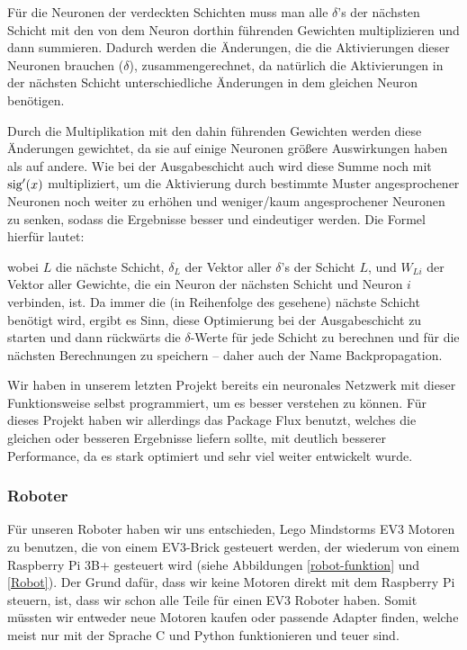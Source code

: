 \documentclass[11pt]{scrartcl}
\begin{document}
	Für die Neuronen der verdeckten Schichten muss man alle $\delta$'s der nächsten Schicht mit den von dem Neuron dorthin führenden Gewichten multiplizieren und dann summieren. Dadurch werden die Änderungen, die die Aktivierungen dieser Neuronen brauchen ($\delta$), zusammengerechnet, da natürlich die Aktivierungen in der nächsten Schicht unterschiedliche Änderungen in dem gleichen Neuron benötigen.
	
	Durch die Multiplikation mit den dahin führenden Gewichten werden diese Änderungen gewichtet, da sie auf einige Neuronen größere Auswirkungen haben als auf andere. Wie bei der Ausgabeschicht auch wird diese Summe noch mit $\textrm{sig}'(x)$ multipliziert, um die Aktivierung durch bestimmte Muster angesprochener Neuronen noch weiter zu erhöhen und weniger/kaum angesprochener Neuronen zu senken, sodass die Ergebnisse besser und eindeutiger werden. Die Formel hierfür lautet:

%
	\noindent wobei $L$ die nächste Schicht, $\delta_L$ der Vektor aller $\delta$'s der Schicht $L$, und $W_{Li}$ der Vektor aller Gewichte, die ein Neuron der nächsten Schicht und Neuron $i$ verbinden, ist.
%
	Da immer die (in Reihenfolge des  gesehene) nächste Schicht benötigt wird, ergibt es Sinn, diese Optimierung bei der Ausgabeschicht zu starten und dann rückwärts die \mbox{$\delta$-Werte} für jede Schicht zu berechnen und für die nächsten Berechnungen zu speichern -- daher auch der Name Backpropagation. \cite{MITNeuronale} \cite{3b1b:nn} \cite{brotcrunsher:backwardpass}


	Wir haben in unserem letzten Projekt bereits ein neuronales Netzwerk mit dieser Funktionsweise selbst programmiert, um es besser verstehen zu können. \cite{AIComposer} Für dieses Projekt haben wir allerdings das Package Flux benutzt, welches die gleichen oder besseren Ergebnisse liefern sollte, mit deutlich besserer Performance, da es stark optimiert und sehr viel weiter entwickelt wurde. \cite{Flux.jl-2018}

	\subsubsection{Roboter}

	Für unseren Roboter haben wir uns entschieden, Lego Mindstorms EV3 Motoren zu benutzen, die von einem EV3-Brick gesteuert werden, der wiederum von einem Raspberry Pi 3B+ gesteuert wird (siehe Abbildungen \ref{robot-funktion} und \ref{Robot}). Der Grund dafür, dass wir keine Motoren direkt mit dem Raspberry Pi steuern, ist, dass wir schon alle Teile für einen EV3 Roboter haben. Somit müssten wir entweder neue Motoren kaufen oder passende Adapter finden, welche meist nur mit der Sprache C und Python funktionieren und teuer sind.
\end{document}
